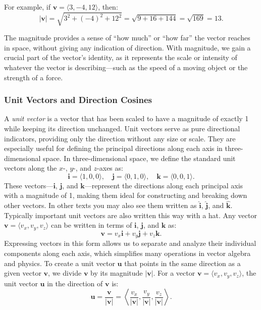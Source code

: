 \noindent For example, if \( \mathbf{v} = \langle 3, -4, 12 \rangle \), then:
\[
|\mathbf{v}| = \sqrt{3^2 + (-4)^2 + 12^2} = \sqrt{9 + 16 + 144} = \sqrt{169} = 13.
\]

\noindent The magnitude provides a sense of ``how much” or ``how far” the vector reaches in space, without giving any indication of direction. With magnitude, we gain a crucial part of the vector’s identity, as it represents the scale or intensity of whatever the vector is describing—such as the speed of a moving object or the strength of a force.

\subsubsection*{Unit Vectors and Direction Cosines}

\noindent A \textit{unit vector} is a vector that has been scaled to have a magnitude of exactly 1 while keeping its direction unchanged. Unit vectors serve as pure directional indicators, providing only the direction without any size or scale. They are especially useful for defining the principal directions along each axis in three-dimensional space. In three-dimensional space, we define the standard unit vectors along the \( x \)-, \( y \)-, and \( z \)-axes as:
\[
\mathbf{i} = \langle 1, 0, 0 \rangle, \quad \mathbf{j} = \langle 0, 1, 0 \rangle, \quad \mathbf{k} = \langle0, 0, 1 \rangle.
\]
\noindent These vectors—\( \mathbf{i} \), \( \mathbf{j} \), and \( \mathbf{k} \)—represent the directions along each principal axis with a magnitude of 1, making them ideal for constructing and breaking down other vectors. In other texts you may also see them written as \( \mathbf{\hat{i}} \), \( \mathbf{\hat{j}} \), and \( \mathbf{\hat{k}} \). Typically important unit vectors are also written this way with a hat. Any vector \( \mathbf{v} = \langle v_x, v_y, v_z \rangle \) can be written in terms of \( \mathbf{i} \), \( \mathbf{j} \), and \( \mathbf{k} \) as:
\[
\mathbf{v} = v_x \mathbf{i} + v_y \mathbf{j} + v_z \mathbf{k}.
\]
\noindent Expressing vectors in this form allows us to separate and analyze their individual components along each axis, which simplifies many operations in vector algebra and physics. To create a unit vector \( \mathbf{u} \) that points in the same direction as a given vector \( \mathbf{v} \), we divide \( \mathbf{v} \) by its magnitude \( |\mathbf{v}| \). For a vector \( \mathbf{v} = \langle v_x, v_y, v_z \rangle \), the unit vector \( \mathbf{u} \) in the direction of \( \mathbf{v} \) is:
\[
\mathbf{u} = \frac{\mathbf{v}}{|\mathbf{v}|} = \left\langle \frac{v_x}{|\mathbf{v}|}, \frac{v_y}{|\mathbf{v}|}, \frac{v_z}{|\mathbf{v}|} \right\rangle.
\]


